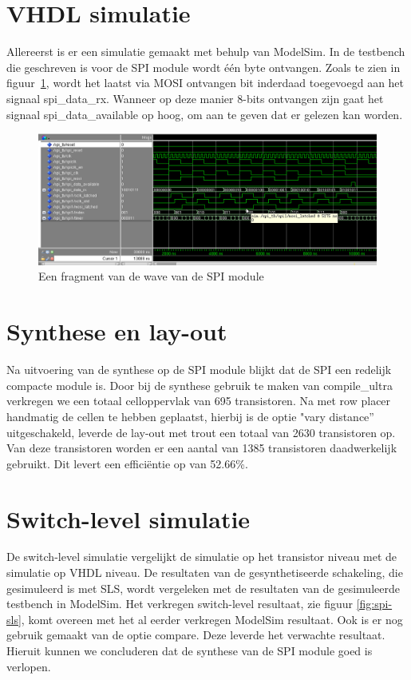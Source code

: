 \documentclass{scrartcl} %
\begin{document}
\section{VHDL simulatie}
Allereerst is er een simulatie gemaakt met behulp van ModelSim. In de testbench die geschreven is voor de SPI module wordt één byte ontvangen. Zoals te zien in figuur~\ref{fig:spi-modelsim}, wordt het laatst via MOSI ontvangen bit inderdaad toegevoegd aan het signaal spi\_data\_rx. Wanneer op deze manier 8-bits ontvangen zijn gaat het signaal spi\_data\_available op hoog, om aan te geven dat er gelezen kan worden.

\begin{figure}[H]
	\centering
	\includegraphics[width=\textwidth]{resource/waveSPI2.png}
	\caption{Een fragment van de wave van de SPI module}
	\label{fig:spi-modelsim}
\end{figure}

\section{Synthese en lay-out}
\label{sec:spi-synth} 
Na uitvoering van de synthese op de SPI module blijkt dat de SPI een redelijk compacte module is. Door bij de synthese gebruik te maken van compile\_ultra verkregen we een totaal celloppervlak van 695 transistoren. Na met row placer handmatig de cellen te hebben geplaatst, hierbij is de optie "vary distance'' uitgeschakeld, leverde de lay-out met trout een totaal van 2630 transistoren op. Van deze transistoren worden er een aantal van 1385 transistoren daadwerkelijk gebruikt. Dit levert een efficiëntie op van 52.66\%.

\section{Switch-level simulatie}
De switch-level simulatie vergelijkt de simulatie op het transistor niveau met de simulatie op VHDL niveau. De resultaten van de gesynthetiseerde schakeling, die gesimuleerd is met SLS, wordt vergeleken met de resultaten van de gesimuleerde testbench in ModelSim. Het verkregen switch-level resultaat, zie figuur \ref{fig:spi-sls}, komt overeen met het al eerder verkregen ModelSim resultaat. Ook is er nog gebruik gemaakt van de optie compare. Deze leverde het verwachte resultaat. Hieruit kunnen we concluderen dat de synthese van de SPI module goed is verlopen. 
\end{document}
